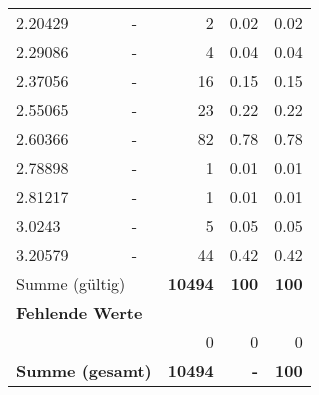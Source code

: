\begin{longtable}{lXrrr}
        2.20429 & \multicolumn{1}{X}{-} & %
          \num{2} &
          \num[round-mode=places,round-precision=2]{0,02} &
          \num[round-mode=places,round-precision=2]{0,02} \\

        2.29086 & \multicolumn{1}{X}{-} & %
          \num{4} &
          \num[round-mode=places,round-precision=2]{0,04} &
          \num[round-mode=places,round-precision=2]{0,04} \\

        2.37056 & \multicolumn{1}{X}{-} & %
          \num{16} &
          \num[round-mode=places,round-precision=2]{0,15} &
          \num[round-mode=places,round-precision=2]{0,15} \\

        2.55065 & \multicolumn{1}{X}{-} & %
          \num{23} &
          \num[round-mode=places,round-precision=2]{0,22} &
          \num[round-mode=places,round-precision=2]{0,22} \\

        2.60366 & \multicolumn{1}{X}{-} & %
          \num{82} &
          \num[round-mode=places,round-precision=2]{0,78} &
          \num[round-mode=places,round-precision=2]{0,78} \\

        2.78898 & \multicolumn{1}{X}{-} & %
          \num{1} &
          \num[round-mode=places,round-precision=2]{0,01} &
          \num[round-mode=places,round-precision=2]{0,01} \\

        2.81217 & \multicolumn{1}{X}{-} & %
          \num{1} &
          \num[round-mode=places,round-precision=2]{0,01} &
          \num[round-mode=places,round-precision=2]{0,01} \\

        3.0243 & \multicolumn{1}{X}{-} & %
          \num{5} &
          \num[round-mode=places,round-precision=2]{0,05} &
          \num[round-mode=places,round-precision=2]{0,05} \\

        3.20579 & \multicolumn{1}{X}{-} & %
          \num{44} &
          \num[round-mode=places,round-precision=2]{0,42} &
          \num[round-mode=places,round-precision=2]{0,42} \\

     \midrule
     \multicolumn{2}{l}{Summe (gültig)} &
       \textbf{\num{10494}} &
     \textbf{100} &
       \textbf{\num[round-mode=places,round-precision=2]{100}} \\
     \multicolumn{5}{l}{\textbf{Fehlende Werte}}\\
      & & 0 & 0 & 0 \\
     \midrule
     \multicolumn{2}{l}{\textbf{Summe (gesamt)}} &
          \textbf{\num{10494}} &
        \textbf{-} &
        \textbf{100} \\
     \bottomrule
     \end{longtable}
     
